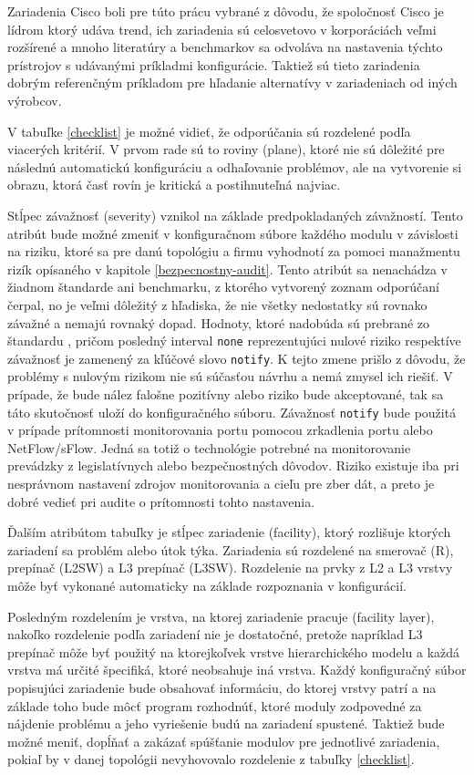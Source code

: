 Zariadenia Cisco boli pre túto prácu vybrané z dôvodu, že spoločnosť Cisco je lídrom ktorý udáva trend, ich zariadenia sú celosvetovo v korporáciách veľmi rozšírené a mnoho literatúry a benchmarkov sa odvoláva na nastavenia týchto prístrojov s udávanými príkladmi konfigurácie. Taktiež sú tieto zariadenia dobrým referenčným príkladom pre hľadanie alternatívy v zariadeniach od iných výrobcov.

V tabuľke \ref{checklist} je možné vidieť, že odporúčania sú rozdelené podľa viacerých kritérií. V prvom rade sú to roviny (plane), ktoré nie sú dôležité pre následnú automatickú konfiguráciu a odhaľovanie problémov, ale na vytvorenie si obrazu, ktorá časť rovín je kritická a postihnuteľná najviac. 

Stĺpec závažnosť (severity) vznikol na základe predpokladaných závažností. Tento atribút bude možné zmeniť v konfiguračnom súbore každého modulu v závislosti na riziku, ktoré sa pre danú topológiu a firmu vyhodnotí za pomoci manažmentu rizík opísaného v kapitole \ref{bezpecnostny-audit}. Tento atribút sa nenachádza v žiadnom štandarde ani benchmarku, z ktorého vytvorený zoznam odporúčaní čerpal, no je veľmi dôležitý z hľadiska, že nie všetky nedostatky sú rovnako závažné a nemajú rovnaký dopad. Hodnoty, ktoré nadobúda sú prebrané zo štandardu , pričom posledný interval \texttt{none} reprezentujúci nulové riziko respektíve závažnosť je zamenený za kľúčové slovo \texttt{notify}. K tejto zmene prišlo z dôvodu, že problémy s nulovým rizikom nie sú súčasťou návrhu a nemá zmysel ich riešiť. V prípade, že bude nález falošne pozitívny alebo riziko bude akceptované, tak sa táto skutočnosť uloží do konfiguračného súboru. Závažnosť \texttt{notify} bude použitá v prípade prítomnosti monitorovania portu pomocou zrkadlenia portu alebo NetFlow/sFlow. Jedná sa totiž o technológie potrebné na monitorovanie prevádzky z legislatívnych alebo bezpečnostných dôvodov. Riziko existuje iba pri nesprávnom nastavení zdrojov monitorovania a cieľu pre zber dát, a preto je dobré vedieť pri audite o prítomnosti tohto nastavenia.
 

Ďalším atribútom tabuľky je stĺpec zariadenie (facility), ktorý rozlišuje ktorých zariadení sa problém alebo útok týka. Zariadenia sú rozdelené na smerovač (R), prepínač (L2SW) a L3 prepínač (L3SW). Rozdelenie na prvky z L2 a L3 vrstvy môže byť vykonané automaticky na základe rozpoznania v konfigurácií.

Posledným rozdelením je vrstva, na ktorej zariadenie pracuje (facility layer), nakoľko rozdelenie podľa zariadení nie je dostatočné, pretože napríklad L3 prepínač môže byť použitý na ktorejkoľvek vrstve hierarchického modelu a každá vrstva má určité špecifiká, ktoré neobsahuje iná vrstva. Každý konfiguračný súbor popisujúci zariadenie bude obsahovať informáciu, do ktorej vrstvy patrí a na základe toho bude môcť program rozhodnúť, ktoré moduly zodpovedné za nájdenie problému a jeho vyriešenie budú na zariadení spustené. Taktiež bude možné meniť, dopĺňať a zakázať spúšťanie modulov pre jednotlivé zariadenia, pokiaľ by v danej topológii nevyhovovalo rozdelenie z tabuľky \ref{checklist}. 

